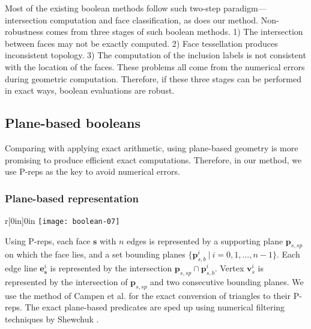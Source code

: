 Most of the existing boolean methods follow such two-step paradigm---intersection computation and face classification, as does our method. Non-robustness comes from three stages of such boolean methods. 1) The intersection between faces may not be exactly computed. 2) Face tessellation produces inconsistent topology. 3) The computation of the inclusion labels is not consistent with the location of the faces. These problems all come from the numerical errors during geometric computation. Therefore, if these three stages can be performed in exact ways, boolean evaluations are robust.



\subsection{Plane-based booleans}
Comparing with applying exact arithmetic, using plane-based geometry \cite{campen2010exact} is more promising to produce efficient exact computations. Therefore, in our method, we use P-reps as the key to avoid numerical errors.

\label{sec:substrates}
\subsubsection{Plane-based representation}


\begin{wrapfigure}{r}[0in]{0in}
\texttt{[image: boolean-07]}
\end{wrapfigure}

Using P-reps, each face $\bm{s}$ with $n$ edges is represented by a supporting plane $\bm{p}_{s,sp}$ on which the face lies, and a set bounding planes $\{\bm{p}_{s,b}^i \ \vert\  i = 0, 1,...,n-1\}$. Each edge line $\bm{e}_{\bm{s}}^i$ is represented by the intersection $\bm{p}_{s,sp} \cap \bm{p}_{s,b}^i$.
Vertex $\bm{v}_s^i$ is represented by the intersection of $\bm{p}_{s,sp}$ and two consecutive bounding planes. We use the method of Campen et al. \cite{campen2010exact} for the exact conversion of triangles to their P-reps. The exact plane-based predicates are sped up using numerical filtering techniques by Shewchuk \cite{shewchuk1997adaptive}.


